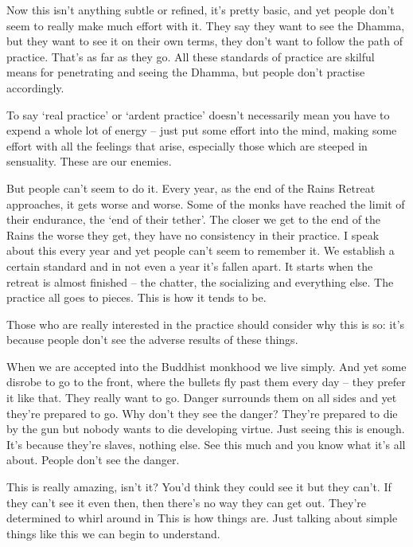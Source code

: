 Now this isn't anything subtle or refined, it's pretty basic, and yet people don't seem to really make much effort with it. They say they want to see the Dhamma, but they want to see it on their own terms, they don't want to follow the path of practice. That's as far as they go. All these standards of practice are skilful means for penetrating and seeing the Dhamma, but people don't practise accordingly. 

To say `real practice' or `ardent practice' doesn't necessarily mean you have to expend a whole lot of energy -- just put some effort into the mind, making some effort with all the feelings that arise, especially those which are steeped in sensuality. These are our enemies. 

But people can't seem to do it. Every year, as the end of the Rains Retreat approaches, it gets worse and worse. Some of the monks have reached the limit of their endurance, the `end of their tether'. The closer we get to the end of the Rains the worse they get, they have no consistency in their practice. I speak about this every year and yet people can't seem to remember it. We establish a certain standard and in not even a year it's fallen apart. It starts when the retreat is almost finished -- the chatter, the socializing and everything else. The practice all goes to pieces. This is how it tends to be. 

Those who are really interested in the practice should consider why this is so: it's because people don't see the adverse results of these things. 

When we are accepted into the Buddhist monkhood we live simply. And yet some disrobe to go to the front, where the bullets fly past them every day -- they prefer it like that. They really want to go. Danger surrounds them on all sides and yet they're prepared to go. Why don't they see the danger? They're prepared to die by the gun but nobody wants to die developing virtue. Just seeing this is enough. It's because they're slaves, nothing else. See this much and you know what it's all about. People don't see the danger. 

This is really amazing, isn't it? You'd think they could see it but they can't. If they can't see it even then, then there's no way they can get out. They're determined to whirl around in  This is how things are. Just talking about simple things like this we can begin to understand. 

